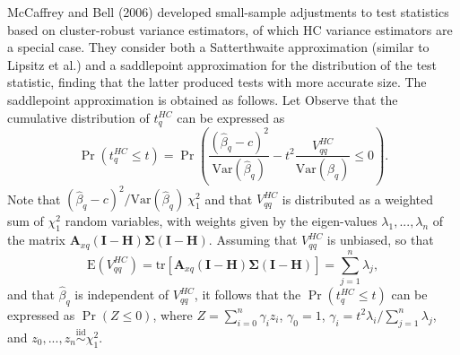 \documentclass{article}\usepackage[]{graphicx}\usepackage[]{color}
\newcommand{\E}{\text{E}}
\newcommand{\Var}{\text{Var}}
\newcommand{\tr}{\text{tr}}
\newcommand{\iid}{\stackrel{\text{iid}}{\sim}}
\newcommand{\bm}{\mathbf}
\newcommand{\bs}{\boldsymbol}
\begin{document}
McCaffrey and Bell (2006) developed small-sample adjustments to test statistics based on cluster-robust variance estimators, of which HC variance estimators are a special case. They consider both a Satterthwaite approximation (similar to Lipsitz et al.) and a saddlepoint approximation for the distribution of the test statistic, finding that the latter produced tests with more accurate size. The saddlepoint approximation is obtained as follows. Let Observe that the cumulative distribution of $t^{HC}_q$ can be expressed as \[
\Pr\left(t^{HC}_q \leq t\right) = \Pr\left(\frac{\left(\hat\beta_q - c\right)^2}{\Var(\hat\beta_q)} - t^2 \frac{V^{HC}_{qq}}{\Var(\hat\beta_q)} \leq 0\right). \]
Note that $\left(\hat\beta_q - c\right)^2 / \Var(\hat\beta_q) ~ \chi^2_1$ and that $V^{HC}_{qq}$ is distributed as a weighted sum of $\chi^2_1$ random variables, with weights given by the eigen-values $\lambda_1,...,\lambda_n$ of the matrix $\bm{A}_{xq} \left(\bm{I} - \bm{H}\right)\bs\Sigma\left(\bm{I} - \bm{H}\right)$. Assuming that $V^{HC}_{qq}$ is unbiased, so that \[
\E\left(V^{HC}_{qq}\right) = \tr\left[\bm{A}_{xq} \left(\bm{I} - \bm{H}\right)\bs\Sigma\left(\bm{I} - \bm{H}\right)\right] = \sum_{j=1}^n \lambda_j, \]
and that $\hat\beta_q$ is independent of $V^{HC}_{qq}$, it follows that the $\Pr\left(t^{HC}_q \leq t\right)$ can be expressed as $\Pr(Z \leq 0)$, where $Z = \sum_{i=0}^n \gamma_i z_i$,
$\gamma_0 = 1$, $\gamma_i = t^2 \lambda_i / \sum_{j=1}^n \lambda_j$, and $z_0,...,z_n \iid \chi^2_1$.
\end{document}

